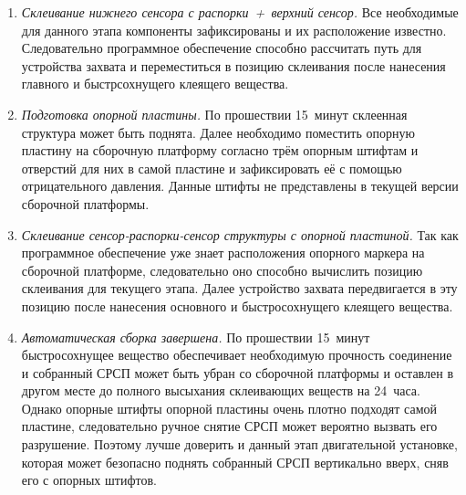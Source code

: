 \begin{enumerate}
\item \emph{Склеивание нижнего сенсора с распорки~+~верхний сенсор.} Все необходимые для данного этапа компоненты зафиксированы и их расположение известно. Следовательно программное обеспечение способно рассчитать путь для устройства захвата и переместиться в позицию склеивания после нанесения главного и быстрсохнущего клеящего вещества.
\item \emph{Подготовка опорной пластины.} По прошествии 15~минут склеенная структура может быть поднята. Далее необходимо поместить опорную пластину на сборочную платформу согласно трём опорным штифтам и отверстий для них в самой пластине и зафиксировать её с помощью отрицательного давления. Данные штифты не представлены в текущей версии сборочной платформы.
\item \emph{Склеивание сенсор-распорки-сенсор структуры с опорной пластиной.} Так как программное обеспечение уже знает расположения опорного маркера на сборочной платформе, следовательно оно способно вычислить позицию склеивания для текущего этапа. Далее устройство захвата передвигается в эту позицию после нанесения основного и быстросохнущего клеящего вещества.

\item \emph{Автоматическая сборка завершена.} По прошествии 15~минут быстросохнущее вещество обеспечивает необходимую прочность соединение и собранный СРСП может быть убран со сборочной платформы и оставлен в другом месте до полного высыхания склеивающих веществ на 24~часа. Однако опорные штифты опорной пластины очень плотно подходят самой пластине, следовательно ручное снятие СРСП может вероятно вызвать его разрушение. Поэтому лучше доверить и данный этап двигательной установке, которая может безопасно поднять собранный СРСП вертикально вверх, сняв его с опорных штифтов.
\end{enumerate}